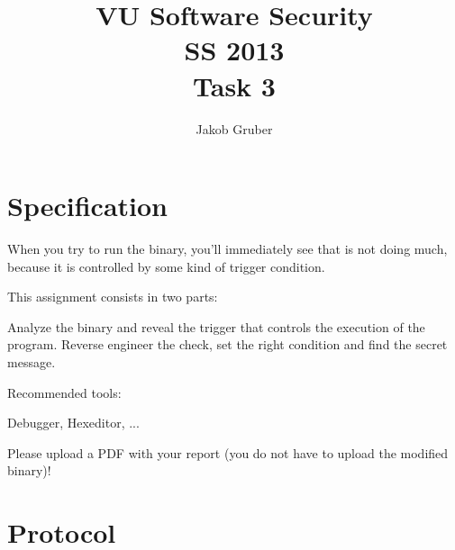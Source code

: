\documentclass[a4paper,10pt]{article}
\title{VU Software Security \\
       SS 2013 \\
       Task 3}
\author{Jakob Gruber}
\begin{document}
\maketitle

\section{Specification}

When you try to run the binary, you'll immediately see that is not doing much,
because it is controlled by some kind of trigger condition.

This assignment consists in two parts:

Analyze the binary and reveal the trigger that controls the execution of the
program.  Reverse engineer the check, set the right condition and find the
secret message.

Recommended tools:

Debugger, Hexeditor, ...

Please upload a PDF with your report (you do not have to upload the modified
binary)! 

\section{Protocol}
\end{document}
